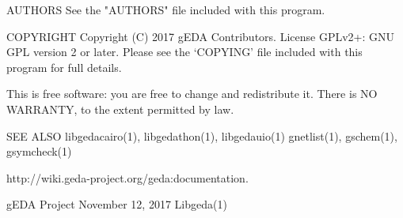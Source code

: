 AUTHORS
       See the "AUTHORS" file included with this program.

COPYRIGHT
       Copyright (C) 2017 gEDA Contributors. License GPLv2+: GNU GPL
       version 2 or later. Please see the `COPYING' file included with this
       program for full details.

       This is free software: you are free to change and redistribute it.
       There is NO WARRANTY, to the extent permitted by law.

SEE ALSO
       libgedacairo(1),  libgedathon(1), libgedauio(1) gnetlist(1), gschem(1),
       gsymcheck(1)

       http://wiki.geda-project.org/geda:documentation.



gEDA Project                   November 12, 2017                    Libgeda(1)
